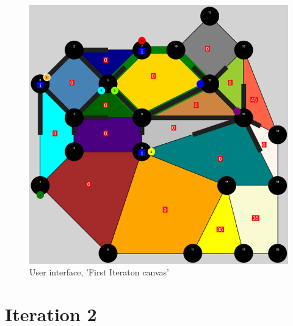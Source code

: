 \begin{figure}[H]
  \centering
    \includegraphics[width=1.0\textwidth]{img/canvas.png}
  \caption{User interface, 'First Iteraton canvas'} 
  \label{fig:canvas}
\end{figure}

\section{Iteration 2}



